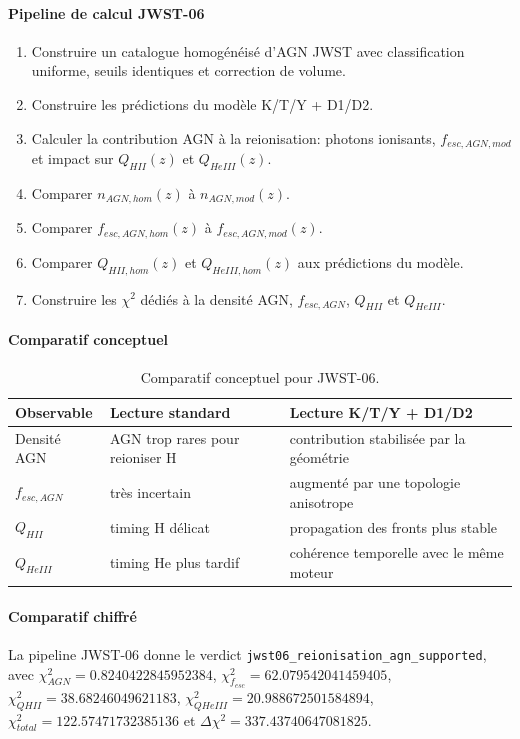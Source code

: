 \documentclass[11pt,a4paper]{article}
\begin{document}
\paragraph{Pipeline de calcul JWST-06}
\begin{enumerate}[leftmargin=*,itemsep=0.2em,topsep=0.2em]
\item Construire un catalogue homogénéisé d'AGN JWST avec classification uniforme, seuils identiques et correction de volume.
\item Construire les prédictions du modèle K/T/Y + D1/D2.
\item Calculer la contribution AGN à la reionisation: photons ionisants, $f_{esc,AGN,mod}$ et impact sur $Q_{HII}(z)$ et $Q_{HeIII}(z)$.
\item Comparer $n_{AGN,hom}(z)$ à $n_{AGN,mod}(z)$.
\item Comparer $f_{esc,AGN,hom}(z)$ à $f_{esc,AGN,mod}(z)$.
\item Comparer $Q_{HII,hom}(z)$ et $Q_{HeIII,hom}(z)$ aux prédictions du modèle.
\item Construire les $\chi^2$ dédiés à la densité AGN, $f_{esc,AGN}$, $Q_{HII}$ et $Q_{HeIII}$.
\end{enumerate}

\paragraph{Comparatif conceptuel}
\begin{table}[htbp]
\centering
\begin{tabular}{>{\raggedright\arraybackslash}p{4cm} >{\raggedright\arraybackslash}p{5.2cm} >{\raggedright\arraybackslash}p{5.2cm}}
\toprule
Observable & Lecture standard & Lecture K/T/Y + D1/D2 \\
\midrule
Densité AGN & AGN trop rares pour reioniser H & contribution stabilisée par la géométrie \\
$f_{esc,AGN}$ & très incertain & augmenté par une topologie anisotrope \\
$Q_{HII}$ & timing H délicat & propagation des fronts plus stable \\
$Q_{HeIII}$ & timing He plus tardif & cohérence temporelle avec le même moteur \\
\bottomrule
\end{tabular}
\caption{Comparatif conceptuel pour JWST-06.}
\end{table}

\paragraph{Comparatif chiffré}
La pipeline JWST-06 donne le verdict \texttt{jwst06\_reionisation\_agn\_supported}, avec $\chi^2_{AGN}=0.8240422845952384$, $\chi^2_{f_{esc}}=62.079542041459405$, $\chi^2_{QHII}=38.68246049621183$, $\chi^2_{QHeIII}=20.988672501584894$, $\chi^2_{total}=122.57471732385136$ et $\Delta\chi^2=337.43740647081825$.
\end{document}
